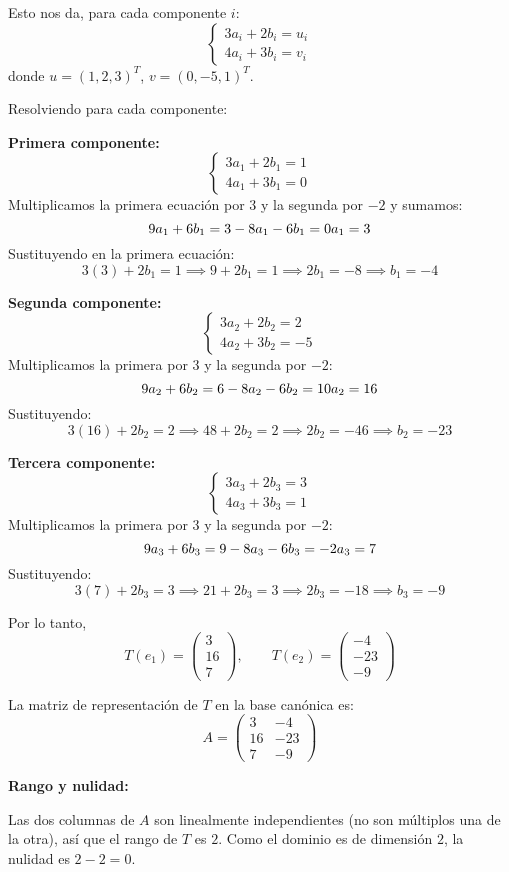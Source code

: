 \begin{prob}
\begin{myproof}
Esto nos da, para cada componente $i$:
\[
\begin{cases}
3a_i + 2b_i = u_i \\
4a_i + 3b_i = v_i
\end{cases}
\]
donde $u = (1,2,3)^T$, $v = (0,-5,1)^T$.

Resolviendo para cada componente:

\textbf{Primera componente:}
\[
\begin{cases}
3a_1 + 2b_1 = 1 \\
4a_1 + 3b_1 = 0
\end{cases}
\]
Multiplicamos la primera ecuación por $3$ y la segunda por $-2$ y sumamos:
\[
9a_1 + 6b_1 = 3 \\
-8a_1 - 6b_1 = 0 \\
a_1 = 3
\]
Sustituyendo en la primera ecuación:
\[
3(3) + 2b_1 = 1 \implies 9 + 2b_1 = 1 \implies 2b_1 = -8 \implies b_1 = -4
\]

\textbf{Segunda componente:}
\[
\begin{cases}
3a_2 + 2b_2 = 2 \\
4a_2 + 3b_2 = -5
\end{cases}
\]
Multiplicamos la primera por $3$ y la segunda por $-2$:
\[
9a_2 + 6b_2 = 6 \\
-8a_2 - 6b_2 = 10 \\
a_2 = 16
\]
Sustituyendo:
\[
3(16) + 2b_2 = 2 \implies 48 + 2b_2 = 2 \implies 2b_2 = -46 \implies b_2 = -23
\]

\textbf{Tercera componente:}
\[
\begin{cases}
3a_3 + 2b_3 = 3 \\
4a_3 + 3b_3 = 1
\end{cases}
\]
Multiplicamos la primera por $3$ y la segunda por $-2$:
\[
9a_3 + 6b_3 = 9 \\
-8a_3 - 6b_3 = -2 \\
a_3 = 7
\]
Sustituyendo:
\[
3(7) + 2b_3 = 3 \implies 21 + 2b_3 = 3 \implies 2b_3 = -18 \implies b_3 = -9
\]

Por lo tanto,
\[
T(e_1) = \begin{pmatrix} 3 \\ 16 \\ 7 \end{pmatrix}, \qquad T(e_2) = \begin{pmatrix} -4 \\ -23 \\ -9 \end{pmatrix}
\]

La matriz de representación de $T$ en la base canónica es:
\[
A = \begin{pmatrix}
3 & -4 \\
16 & -23 \\
7 & -9
\end{pmatrix}
\]

\textbf{Rango y nulidad:}

Las dos columnas de $A$ son linealmente independientes (no son múltiplos una de la otra), así que el rango de $T$ es $2$. Como el dominio es de dimensión $2$, la nulidad es $2 - 2 = 0$.
\end{myproof}
\end{prob}


